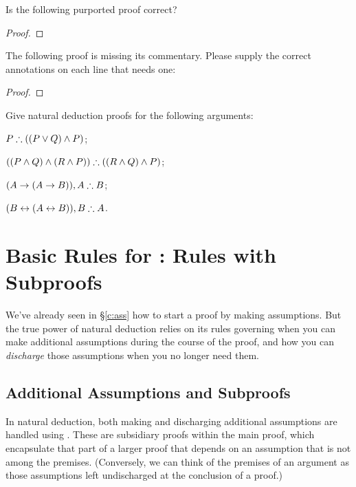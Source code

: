 \problempart
Is the following purported proof correct?

\begin{proof}
	\open
\end{proof}

\problempart
The following proof is missing its commentary. Please supply the correct annotations on each line that needs one: 

\begin{proof}
\open
{}
\end{proof}


\problempart
Give natural deduction proofs for the following arguments: \begin{earg}
	\item $P \mathrel{\therefore} ((P \vee Q) \wedge P)$;
	\item $((P \wedge Q) \wedge (R \wedge P)) \mathrel{\therefore} ((R \wedge Q) \wedge P)$;
	\item $(A \rightarrow (A \rightarrow B)), A \mathrel{\therefore} B$;
	\item $(B \leftrightarrow (A \leftrightarrow B)), B \mathrel{\therefore} A$.
\end{earg}



\chapter{Basic Rules for \textnormal{\TFL}: Rules with Subproofs}\label{s:BasicTFLs}

We've already seen in §\ref{c:ass} how to start a proof by making assumptions. But the true power of natural deduction relies on its rules governing when you can make additional assumptions during the course of the proof, and how you can \emph{discharge} those assumptions when you no longer need them. 


\section{Additional Assumptions and Subproofs}\label{s.subproof}

In natural deduction, both making and discharging additional assumptions are handled using . These are subsidiary proofs within the main proof, which encapsulate that part of a larger proof that depends on an assumption that is not among the premises. (Conversely, we can think of the premises of an argument as those assumptions left undischarged at the conclusion of a proof.)

